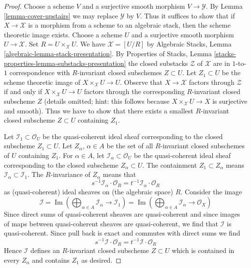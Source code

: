 \documentclass{stacks-project}
\theoremstyle{plain}
\theoremstyle{definition}
\theoremstyle{remark}
\numberwithin{equation}{subsection}
\def\Im{\mathop{\mathrm{Im}}}
\begin{document}
\begin{proof}
Choose a scheme $V$ and a surjective smooth morphism $V \to \mathcal{Y}$.
By Lemma \ref{lemma-cover-upstairs} we may replace $\mathcal{Y}$ by $V$.
Thus it suffices to show that if $X \to \mathcal{X}$ is a morphism from
a scheme to an algebraic stack, then the scheme theoretic image exists.
Choose a scheme $U$ and a surjective smooth morphism $U \to \mathcal{X}$.
Set $R = U \times_\mathcal{X} U$.
We have $\mathcal{X} = [U/R]$ by
Algebraic Stacks, Lemma \ref{algebraic-lemma-stack-presentation}.
By Properties of Stacks, Lemma
\ref{stacks-properties-lemma-substacks-presentation}
the closed substacks $\mathcal{Z}$ of $\mathcal{X}$
are in $1$-to-$1$ correspondence with $R$-invariant
closed subschemes $Z \subset U$.
Let $Z_1 \subset U$ be the scheme theoretic image of
$X \times_\mathcal{X} U \to U$.
Observe that $X \to \mathcal{X}$ factors through $\mathcal{Z}$
if and only if $X \times_\mathcal{X} U \to U$ factors through
the corresponding $R$-invariant closed subscheme $Z$
(details omitted; hint: this follows because
$X \times_\mathcal{X} U \to X$ is surjective and smooth).
Thus we have to show that there exists a smallest $R$-invariant
closed subscheme $Z \subset U$ containing $Z_1$.

\medskip\noindent
Let $\mathcal{I}_1 \subset \mathcal{O}_U$ be the quasi-coherent
ideal sheaf corresponding to the closed subscheme $Z_1 \subset U$.
Let $Z_\alpha$, $\alpha \in A$ be the set of all $R$-invariant
closed subschemes of $U$ containing $Z_1$.
For $\alpha \in A$, let $\mathcal{I}_\alpha \subset \mathcal{O}_U$
be the quasi-coherent ideal sheaf corresponding to the closed subscheme
$Z_\alpha \subset U$. The containment $Z_1 \subset Z_\alpha$
means $\mathcal{I}_\alpha \subset \mathcal{I}_1$.
The $R$-invariance of $Z_\alpha$ means that
$$
s^{-1}\mathcal{I}_\alpha \cdot \mathcal{O}_R =
t^{-1}\mathcal{I}_\alpha \cdot \mathcal{O}_R
$$
as (quasi-coherent) ideal sheaves on (the algebraic space) $R$.
Consider the image
$$
\mathcal{I} =
\Im\left(
\bigoplus\nolimits_{\alpha \in A} \mathcal{I}_\alpha \to \mathcal{I}_1
\right) =
\Im\left(
\bigoplus\nolimits_{\alpha \in A} \mathcal{I}_\alpha \to \mathcal{O}_X
\right)
$$
Since direct sums of quasi-coherent sheaves are quasi-coherent
and since images of maps between quasi-coherent sheaves are
quasi-coherent, we find that $\mathcal{I}$ is quasi-coherent.
Since pull back is exact and commutes with direct sums we find
$$
s^{-1}\mathcal{I} \cdot \mathcal{O}_R =
t^{-1}\mathcal{I} \cdot \mathcal{O}_R
$$
Hence $\mathcal{I}$ defines an $R$-invariant closed subscheme
$Z \subset U$ which is contained in every $Z_\alpha$ and contains
$Z_1$ as desired.
\end{proof}
\end{document}
